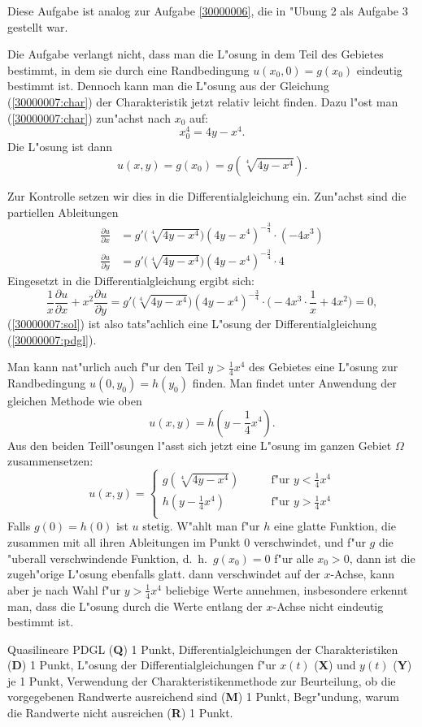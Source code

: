 \begin{diskussion}
Diese Aufgabe ist analog zur Aufgabe \ref{30000006}, die in
"Ubung 2 als Aufgabe 3 gestellt war.

Die Aufgabe verlangt nicht, dass man die L"osung in dem Teil des
Gebietes bestimmt, in dem sie durch eine Randbedingung
$u(x_0,0)=g(x_0)$ eindeutig bestimmt ist. Dennoch kann man die
L"osung aus der Gleichung (\ref{30000007:char}) der Charakteristik
jetzt relativ leicht finden. Dazu l"ost man (\ref{30000007:char})
zun"achst nach $x_0$ auf:
\[
x_0^4 = 4y-x^4.
\]
Die L"osung ist dann
\begin{equation}
u(x,y)=g(x_0)
=
g(\sqrt[4]{4y-x^4}).
\label{30000007:sol}
\end{equation}

Zur Kontrolle setzen wir dies in die Differentialgleichung ein.
Zun"achst sind die partiellen Ableitungen
\begin{align*}
\frac{\partial u}{\partial x}
&=
g'\bigl(\sqrt[4]{4y-x^4}\bigr) (4y-x^4)^{-\frac34}
\cdot (-4x^3)
\\
\frac{\partial u}{\partial y}
&=
g'\bigl(\sqrt[4]{4y-x^4}\bigr) (4y-x^4)^{-\frac34}
\cdot 4
\end{align*}
Eingesetzt in die Differentialgleichung ergibt sich:
\[
\frac1x\frac{\partial u}{\partial x}+x^2\frac{\partial u}{\partial y}=
g'\bigl(\sqrt[4]{4y-x^4}\bigr) (4y-x^4)^{-\frac34}
\cdot
\biggl(
-4x^3\cdot\frac1x+4x^2
\biggr)=0,
\]
(\ref{30000007:sol}) ist also tats"achlich eine L"osung der
Differentialgleichung
(\ref{30000007:pdgl}).

Man kann nat"urlich auch f"ur den Teil $y>\frac14x^4$ des
Gebietes eine L"osung zur Randbedingung $u(0,y_0)=h(y_0)$ finden.
Man findet unter Anwendung der gleichen Methode wie oben 
\[
u(x,y)=h(y-{\textstyle\frac14}x^4).
\]
Aus den beiden Teill"osungen l"asst sich jetzt eine L"osung im
ganzen Gebiet $\Omega$ zusammensetzen: 
\[
u(x,y)=\begin{cases}
g(\sqrt[4]{4y-x^4})&\qquad \text{f"ur $y<\frac14x^4$}\\
h(y-\frac14x^4)&\qquad \text{f"ur $y>\frac14x^4$}\\
\end{cases}
\]
Falls $g(0)=h(0)$ ist $u$ stetig. W"ahlt man f"ur $h$ eine glatte
Funktion, die zusammen mit all ihren Ableitungen im Punkt $0$
verschwindet, und f"ur $g$ die "uberall verschwindende Funktion,
d.~h.~$g(x_0)=0$ f"ur alle $x_0>0$, dann ist die zugeh"orige L"osung
ebenfalls glatt. dann verschwindet auf der $x$-Achse,
kann aber je nach Wahl f"ur $y>\frac14x^4$ beliebige Werte
annehmen, insbesondere erkennt man, dass die L"osung durch die
Werte entlang der $x$-Achse nicht eindeutig bestimmt ist.
\end{diskussion}

\begin{bewertung}
Quasilineare PDGL ({\bf Q}) 1 Punkt,
Differentialgleichungen der Charakteristiken ({\bf D}) 1 Punkt,
L"osung der Differentialgleichungen f"ur $x(t)$ ({\bf X}) 
und $y(t)$ ({\bf Y}) je 1 Punkt,
Verwendung der Charakteristikenmethode zur Beurteilung, ob die
vorgegebenen Randwerte ausreichend sind ({\bf M}) 1 Punkt,
Begr"undung, warum die Randwerte nicht ausreichen ({\bf R}) 1 Punkt.
\end{bewertung}
